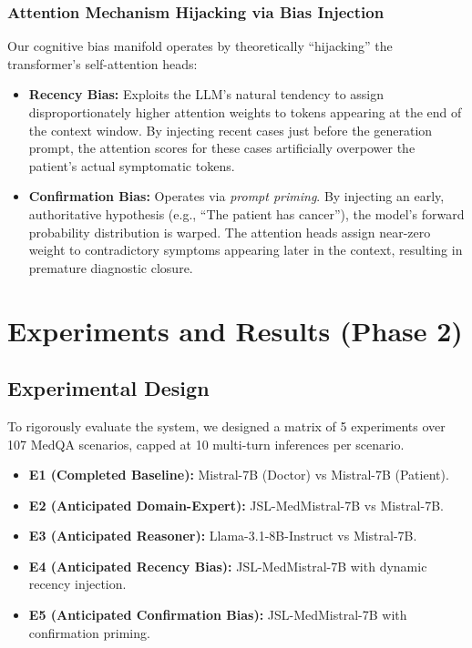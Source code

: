 \documentclass[12pt, a4paper, twoside]{report}
\begin{document}
\subsection{Attention Mechanism Hijacking via Bias Injection}
Our cognitive bias manifold operates by theoretically ``hijacking'' the transformer's self-attention heads:
\begin{itemize}
    \item \textbf{Recency Bias:} Exploits the LLM's natural tendency to assign disproportionately higher attention weights to tokens appearing at the end of the context window. By injecting recent cases just before the generation prompt, the attention scores for these cases artificially overpower the patient's actual symptomatic tokens.
    \item \textbf{Confirmation Bias:} Operates via \textit{prompt priming}. By injecting an early, authoritative hypothesis (e.g., ``The patient has cancer''), the model's forward probability distribution is warped. The attention heads assign near-zero weight to contradictory symptoms appearing later in the context, resulting in premature diagnostic closure.
\end{itemize}

\chapter{Experiments and Results (Phase 2)}

\section{Experimental Design}
To rigorously evaluate the system, we designed a matrix of 5 experiments over 107 MedQA scenarios, capped at 10 multi-turn inferences per scenario.
\begin{itemize}
    \item \textbf{E1 (Completed Baseline):} Mistral-7B (Doctor) vs Mistral-7B (Patient).
    \item \textbf{E2 (Anticipated Domain-Expert):} JSL-MedMistral-7B vs Mistral-7B.
    \item \textbf{E3 (Anticipated Reasoner):} Llama-3.1-8B-Instruct vs Mistral-7B.
    \item \textbf{E4 (Anticipated Recency Bias):} JSL-MedMistral-7B with dynamic recency injection.
    \item \textbf{E5 (Anticipated Confirmation Bias):} JSL-MedMistral-7B with confirmation priming.
\end{itemize}
\end{document}
